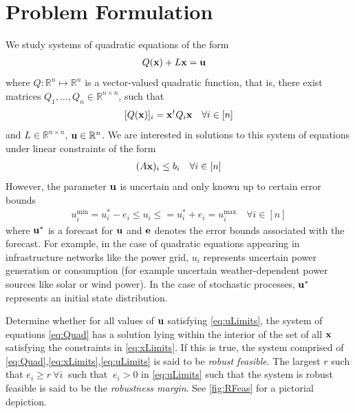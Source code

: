 \section{Problem Formulation} \label{sec:probform}  

We study systems of quadratic equations of the form
\begin{align}
& Q(\mathbf{x})+L\mathbf{x}=\mathbf{u}\label{eq:Quad}
\end{align}
where $Q: \mathbb{R}^n \mapsto \mathbb{R}^n$ is a vector-valued quadratic function, that is, there exist matrices $Q_1,\ldots,Q_n \in \mathbb{R}^{n\times n}$, such that
\[[Q(\mathbf{x})]_i = \mathbf{x}^t Q_{i} \mathbf{x} \quad \forall i \in [n]\]
and $L \in \mathbb{R}^{n\times n}$, $\mathbf{u} \in \mathbb{R}^n$. 
We are interested in solutions to this system of equations under linear constraints of the form
\begin{align}
(A\mathbf{x})_i\leq b_i \quad \forall i \in [n]\label{eq:xLimits}
\end{align}
However, the parameter $\mathbf{u}$ is uncertain and only known up to certain error bounds
\begin{align}
u^{\min}_i=u_i^*-e_i \leq u_i \leq =u_i^*+e_i=u^{\max}_i \quad \forall i \in [n] \label{eq:uLimits}
\end{align}
where $\mathbf{u}^*$ is a forecast for $\mathbf{u}$ and $\mathbf{e}$ denotes the error bounds associated with the forecast. 
For example, in the case of quadratic equations appearing in infrastructure networks like the power grid, $u_i$ represents uncertain power generation or consumption (for example uncertain weather-dependent power sources like solar or wind power). 
In the case of stochastic processes, $\mathbf{u}^*$ represents an initial state distribution.

\begin{cdef}  \label{RobustDef}
Determine whether for all values of $\mathbf{u}$ satisfying \eqref{eq:uLimits}, the system of equations \eqref{eq:Quad} has a solution lying within the interior of the set of all  $\mathbf{x}$ satisfying the constraints in \eqref{eq:xLimits}. 
If this is true, the system comprised of \eqref{eq:Quad},\eqref{eq:xLimits},\eqref{eq:uLimits} is said to be \emph{robust feasible}. 
The largest $r$ such that $e_i\geq r \ \forall i~$ such that $~e_i>0$ in \eqref{eq:uLimits} such that the system is robust feasible is said to be the \emph{robustness margin}. 
See \cref{fig:RFeas} for a pictorial depiction. 
\end{cdef}

